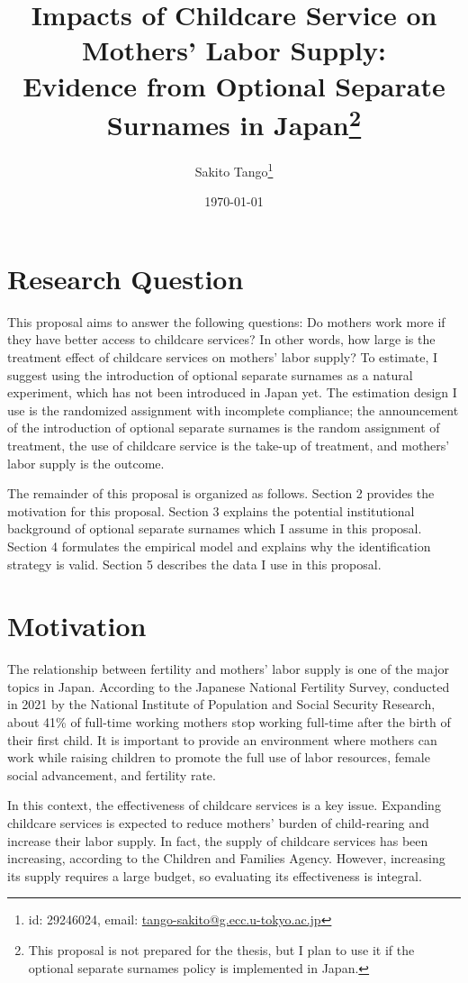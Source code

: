 \documentclass[12pt]{article}
\title{Impacts of Childcare Service on Mothers' Labor Supply: \\ 
       Evidence from Optional Separate Surnames in Japan\thanks{
        This proposal is not prepared for the thesis, but I plan to use it if the optional separate surnames policy is implemented in Japan.
       }
       }
\author{Sakito Tango\thanks{id: 29246024, 
        email: \href{mailto:tango-sakito@g.ecc.u-tokyo.ac.jp}{tango-sakito@g.ecc.u-tokyo.ac.jp}
}
}
\date{\today}
\begin{document}
\maketitle

\section{Research Question}
This proposal aims to answer the following questions: Do mothers work more if they have better access to childcare services? 
In other words, how large is the treatment effect of childcare services on mothers' labor supply?
To estimate, I suggest using the introduction of optional separate surnames as a natural experiment, which has not been introduced in Japan yet.
The estimation design I use is the randomized assignment with incomplete compliance; the announcement of the introduction of optional separate surnames is the random assignment of treatment, the use of childcare service is the take-up of treatment, and mothers' labor supply is the outcome.


The remainder of this proposal is organized as follows. 
Section 2 provides the motivation for this proposal. 
Section 3 explains the potential institutional background of optional separate surnames which I assume in this proposal.
Section 4 formulates the empirical model and explains why the identification strategy is valid.
Section 5 describes the data I use in this proposal.


\section{Motivation}
The relationship between fertility and mothers' labor supply is one of the major topics in Japan. 
According to the Japanese National Fertility Survey, conducted in 2021 by the National Institute of Population and Social Security Research, about 41\%  of full-time working mothers stop working full-time after the birth of their first child.
It is important to provide an environment where mothers can work while raising children to promote the full use of labor resources, female social advancement, and fertility rate.


In this context, the effectiveness of childcare services is a key issue. 
Expanding childcare services is expected to reduce mothers' burden of child-rearing and increase their labor supply.
In fact, the supply of childcare services has been increasing, according to the Children and Families Agency. 
However, increasing its supply requires a large budget, so evaluating its effectiveness is integral.
\end{document}
